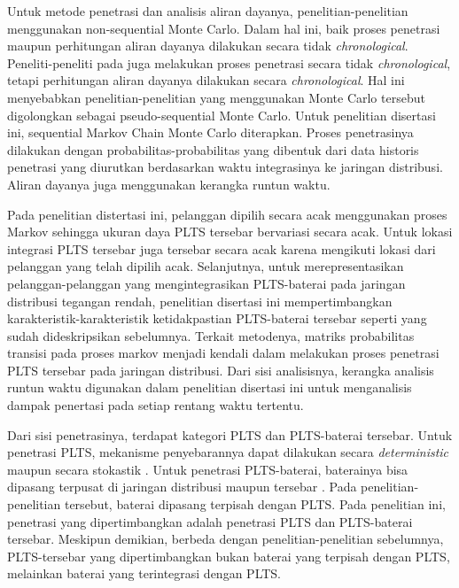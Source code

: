 {{{{{{Untuk metode penetrasi dan analisis aliran dayanya, penelitian-penelitian \cite{Arshad2017,Deakin2019,Watson2016} menggunakan non-sequential Monte Carlo. Dalam hal ini, baik proses penetrasi maupun perhitungan aliran dayanya dilakukan secara tidak \textit{chronological}. Peneliti-peneliti pada \cite{Dubey2017,Ding2017,Bollen2017,Torquato2018,Vergara2020,Quiles2020} juga melakukan proses penetrasi secara tidak \textit{chronological}, tetapi perhitungan aliran dayanya dilakukan secara \textit{chronological}. Hal ini menyebabkan penelitian-penelitian yang menggunakan Monte Carlo tersebut digolongkan sebagai pseudo-sequential Monte Carlo. Untuk penelitian disertasi ini, sequential Markov Chain Monte Carlo diterapkan. Proses penetrasinya dilakukan dengan probabilitas-probabilitas yang dibentuk dari data historis penetrasi yang diurutkan berdasarkan waktu integrasinya ke jaringan distribusi. Aliran dayanya juga menggunakan kerangka runtun waktu.

Pada penelitian distertasi ini, pelanggan dipilih secara acak menggunakan proses Markov sehingga ukuran daya PLTS tersebar bervariasi secara acak. Untuk lokasi integrasi PLTS tersebar juga tersebar secara acak karena mengikuti lokasi dari pelanggan yang telah dipilih acak. Selanjutnya, untuk merepresentasikan pelanggan-pelanggan yang mengintegrasikan PLTS-baterai pada jaringan distribusi tegangan rendah, penelitian disertasi ini mempertimbangkan karakteristik-karakteristik ketidakpastian PLTS-baterai tersebar seperti yang sudah dideskripsikan sebelumnya. Terkait metodenya, matriks probabilitas transisi pada proses markov menjadi kendali dalam melakukan proses penetrasi PLTS tersebar pada jaringan distribusi. Dari sisi analisisnya, kerangka analisis runtun waktu digunakan dalam penelitian disertasi ini untuk menganalisis dampak penertasi pada setiap rentang waktu tertentu. 

Dari sisi penetrasinya, terdapat kategori PLTS dan PLTS-baterai tersebar. Untuk penetrasi PLTS, mekanisme penyebarannya dapat dilakukan secara \textit{deterministic} \cite{Jayasekara2016,Hashemi2018,Hasanpor2019} maupun secara stokastik \cite{Epri2012,Dubey2015,Dubey2017,Ding2017,Bollen2017,Torquato2018,Deakin2019,Vergara2020}. Untuk penetrasi PLTS-baterai, baterainya bisa dipasang terpusat di jaringan distribusi \cite{Jayasekara2016} maupun tersebar \cite{Hashemi2018,Hasanpor2019,Al-Saffar2020}. Pada penelitian-penelitian tersebut, baterai dipasang terpisah dengan PLTS. Pada penelitian ini, penetrasi yang dipertimbangkan adalah penetrasi PLTS dan PLTS-baterai tersebar. Meskipun demikian, berbeda dengan penelitian-penelitian sebelumnya, PLTS-tersebar yang dipertimbangkan bukan baterai yang terpisah dengan PLTS, melainkan baterai yang terintegrasi dengan PLTS.

}}}}}}
